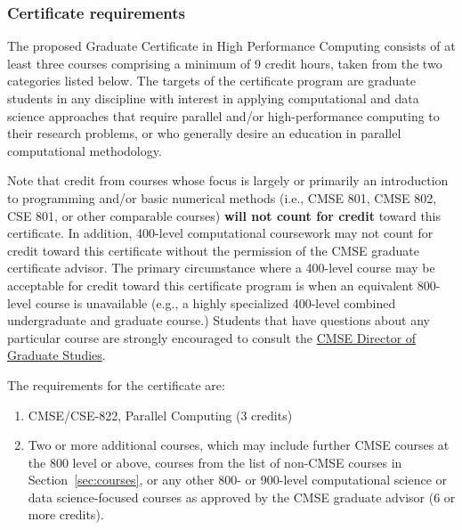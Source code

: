 \subsubsection{Certificate requirements}

The proposed Graduate Certificate in High Performance Computing
consists of at least three courses comprising a minimum of 9 credit
hours, taken from the two categories listed below. The targets of the
certificate program are graduate students in any discipline with
interest in applying computational and data science approaches that
require parallel and/or high-performance computing to their research
problems, or who generally desire an education in parallel
computational methodology.

Note that credit from courses whose focus is largely or primarily an
introduction to programming and/or basic numerical methods (i.e., CMSE
801, CMSE 802, CSE 801, or other comparable courses) \textbf{will not count
for credit} toward this certificate. In addition, 400-level
computational coursework may not count for credit toward this
certificate without the permission of the CMSE graduate certificate
advisor. The primary circumstance where a 400-level course may be
acceptable for credit toward this certificate program is when an
equivalent 800-level course is unavailable (e.g., a highly specialized
400-level combined undergraduate and graduate course.) Students that
have questions about any particular course are strongly encouraged to
consult the \href{mailto:cmsegrad@msu.edu}{CMSE Director of Graduate Studies}.

\vspace{2mm}
\noindent
The requirements for the certificate are:

\begin{enumerate}

\item CMSE/CSE-822, Parallel Computing (3 credits)  

\item Two or more additional courses, which may include further CMSE
  courses at the 800 level or above, courses from the list of non-CMSE
  courses in Section~\ref{sec:courses}, or any other 800-
  or 900-level computational science or data science-focused courses
  as approved by the CMSE graduate advisor (6 or more credits).

\end{enumerate}

